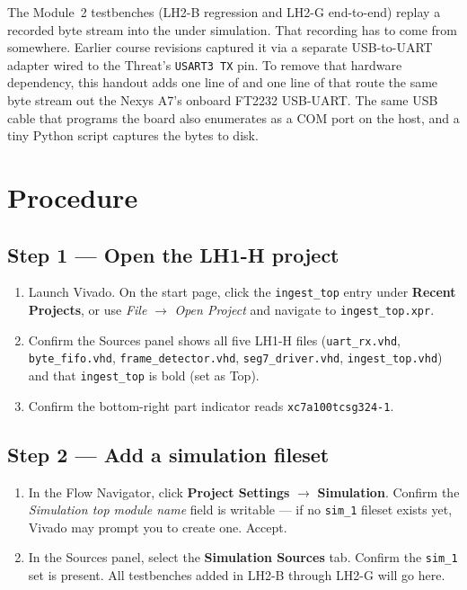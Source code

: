 \documentclass[11pt,letterpaper]{article}
\begin{document}
\begin{tcolorbox}[infobox={Why we capture \texttt{.bin} files in this handout}]
	The Module~2 testbenches (LH2-B regression and LH2-G end-to-end) replay a recorded byte stream into the \HDL{} under simulation. That recording has to come from somewhere. Earlier course revisions captured it via a separate USB-to-UART adapter wired to the Threat's \texttt{USART3 TX} pin. To remove that hardware dependency, this handout adds one line of \VHDL{} and one line of \XDC{} that route the same byte stream out the Nexys A7's onboard FT2232 USB-UART. The same USB cable that programs the board also enumerates as a \mbox{COM} port on the host, and a tiny Python script captures the bytes to disk.
\end{tcolorbox}

\section{Procedure}

\subsection{Step 1 --- Open the LH1-H project}
\begin{enumerate}[leftmargin=2em]
	\item Launch Vivado. On the start page, click the \texttt{ingest\_top} entry under \textbf{Recent Projects}, or use \textit{File} $\to$ \textit{Open Project} and navigate to \texttt{ingest\_top.xpr}.
	\item Confirm the Sources panel shows all five LH1-H files (\texttt{uart\_rx.vhd}, \texttt{byte\_fifo.vhd}, \texttt{frame\_\allowbreak detector.vhd}, \texttt{seg7\_driver.vhd}, \texttt{ingest\_top.vhd}) and that \texttt{ingest\_top} is bold (set as Top).
	\item Confirm the bottom-right part indicator reads \texttt{xc7a100tcsg324-1}.
\end{enumerate}

\subsection{Step 2 --- Add a simulation fileset}
\begin{enumerate}[leftmargin=2em]
	\item In the Flow Navigator, click \textbf{Project Settings} $\to$ \textbf{Simulation}. Confirm the \textit{Simulation top module name} field is writable --- if no \texttt{sim\_1} fileset exists yet, Vivado may prompt you to create one. Accept.
	\item In the Sources panel, select the \textbf{Simulation Sources} tab. Confirm the \texttt{sim\_1} set is present. All testbenches added in LH2-B through LH2-G will go here.
\end{enumerate}
\end{document}
